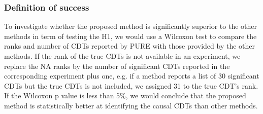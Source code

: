 %


\subsubsection{Definition of success}
To investigate whether the proposed method  is significantly superior to the other methods in term of testing the H1, we would use a Wilcoxon test to compare the ranks and number of CDTs reported by PURE with those provided by the  other methods. 
If the rank of the true CDTs is not available in an experiment, we replace the NA ranks by the number of significant CDTs reported in the corresponding experiment plus one, 
e.g. if a method reports a list of 30 significant CDTs but the true CDTs is not included, we assigned 31 to the true CDT's rank.
If the Wilcoxon p value is less than 5\%, we would conclude that the proposed method is statistically better at identifying the causal CDTs than other methods.


